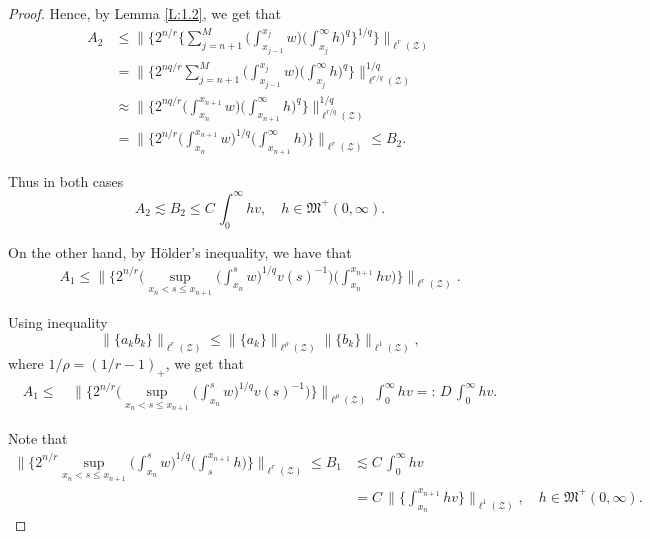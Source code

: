 \documentclass[12pt]{amsart}
\theoremstyle{plain}
\theoremstyle{definition}
\numberwithin{thm}{section}
\numberwithin{equation}{section}
\begin{document}
\begin{proof}
	Hence, by Lemma \ref{L:1.2}, we get that
	\begin{align*}
    A_2 & \le \bigg\| \bigg\{ 2^{n / r}  \bigg\{ \sum_{j=n+1}^M \bigg(\int_{x_{j-1}}^{x_j} w\bigg) \bigg( \int_{x_j}^{\infty} h \bigg)^q \bigg\}^{1/q}\bigg\} \bigg\|_{\ell^r ({\mathcal Z})} \\
    & = \bigg\| \bigg\{ 2^{n q / r}  \sum_{j=n+1}^M \bigg(\int_{x_{j-1}}^{x_j} w\bigg) \bigg( \int_{x_j}^{\infty} h \bigg)^q \bigg\} \bigg\|_{\ell^{r / q} ({\mathcal Z})}^{1 / q} \\
    & \approx \bigg\| \bigg\{ 2^{n q / r}  \bigg(\int_{x_n}^{x_{n+1}} w\bigg) \bigg( \int_{x_{n+1}}^{\infty} h \bigg)^q \bigg\} \bigg\|_{\ell^{r / q} ({\mathcal Z})}^{1 / q} \\
    & = \bigg\| \bigg\{ 2^{n / r} \bigg(
    \int_{x_n}^{x_{n+1}} w \bigg)^{1 / q} \bigg( \int_{x_{n+1}}^{\infty} h \bigg) \bigg\} \bigg\|_{\ell^r ({\mathcal Z})} \le B_2.
	\end{align*}
	
	Thus in both cases
	$$
	A_2 \lesssim B_2 \le C \, \int_0^{\infty} h v, \quad h \in {\mathfrak M}^+(0,\infty).
	$$	
	
	On the other hand, by H\"{o}lder's inequality, we have that
	\begin{align*}
	A_1 \le \bigg\| \bigg\{ 2^{n / r} \bigg( \sup_{{x_n} < s \le x_{n+1}} \bigg(
	\int_{x_n}^s w \bigg)^{1 / q} v(s)^{-1} \bigg) \bigg( \int_{x_n}^{x_{n+1}} h v\bigg)\bigg\} \bigg\|_{\ell^r ({\mathcal Z})}. 
	\end{align*}

	Using inequality
	\begin{equation}\label{discrete.Hold.}
	\|\{ a_k b_k \}\|_{\ell^r ({\mathcal Z})} \le \|\{ a_k \}\|_{\ell^{\rho} ({\mathcal Z})} \|\{
	b_k \}\|_{\ell^1 ({\mathcal Z})},
	\end{equation}
	where $1 / \rho = (1 / r - 1)_+$, we get that
	\begin{align*}
	A_1 \le & \, \bigg\| \bigg\{ 2^{n/r} \bigg( \sup_{{x_n} < s \le x_{n+1}} \bigg(
	\int_{x_n}^s w \bigg)^{1 / q} v(s)^{-1} \bigg) \bigg\} \bigg\|_{\ell^{\rho}({\mathcal Z})} \,  \int_0^{\infty} h v =: \, D  \, \int_0^{\infty} h v.
	\end{align*}

	Note that
	\begin{align*}
	\bigg\| \bigg\{ 2^{n/r} \sup_{x_n < s \le x_{n+1}} \bigg( \int_{x_n}^s w \bigg)^{1 / q} \bigg( \int_s^{x_{n+1}} h\bigg) \bigg\} \bigg\|_{\ell^r ({\mathcal Z})} \le B_1 & \lesssim C\, \int_0^{\infty} h v \\
	& = C\, \bigg\| \bigg\{ \int_{x_n}^{x_{n+1}} h v \bigg\} \bigg\|_{\ell^1 ({\mathcal Z})}, \quad h \in {\mathfrak M}^+(0,\infty).
	\end{align*}


\end{proof}
\end{document}
